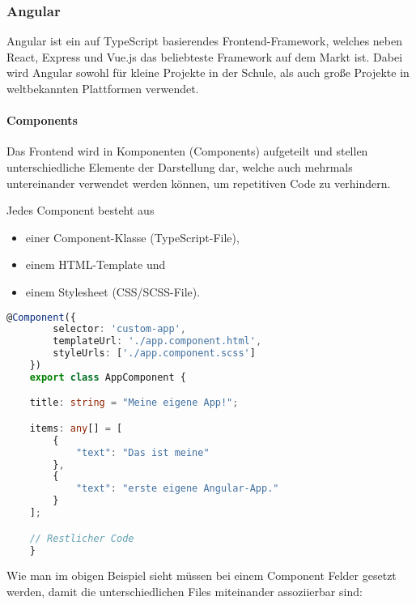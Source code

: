 \subsubsection{Angular}

Angular ist ein auf TypeScript basierendes Frontend-Framework, welches neben React, Express und Vue.js das beliebteste Framework auf dem Markt ist. \cite{SFT} Dabei wird Angular sowohl für kleine Projekte in der Schule, als auch große Projekte in weltbekannten Plattformen verwendet.

\paragraph*{Components}

Das Frontend wird in Komponenten (Components) aufgeteilt und stellen unterschiedliche Elemente der Darstellung dar, welche auch mehrmals untereinander verwendet werden können, um repetitiven Code zu verhindern.

Jedes Component besteht aus

\begin{itemize}
    \item einer Component-Klasse (TypeScript-File),
    \item einem HTML-Template und
    \item einem Stylesheet (CSS/SCSS-File).
\end{itemize}

\begin{lstlisting}[language=TypeScript,caption={Beispiel eines Angular-Components}]
    @Component({
        selector: 'custom-app',
        templateUrl: './app.component.html',
        styleUrls: ['./app.component.scss']
    })
    export class AppComponent {

    title: string = "Meine eigene App!";

    items: any[] = [
        {
            "text": "Das ist meine"
        },
        {
            "text": "erste eigene Angular-App."
        }
    ];

    // Restlicher Code
    }
\end{lstlisting}

Wie man im obigen Beispiel sieht müssen bei einem Component Felder gesetzt werden, damit die unterschiedlichen Files miteinander assoziierbar sind:

